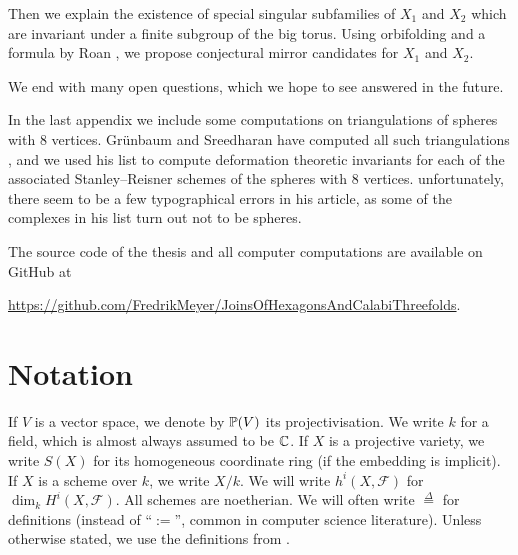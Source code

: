 \begin{itemize}
Then we explain the existence of special singular subfamilies of $X_1$ and $X_2$ which are invariant under a finite subgroup of the big torus. Using {orbifolding} and a formula by Roan \cite{roan_euler}, we propose conjectural mirror candidates for $X_1$ and $X_2$.

We end with many open questions, which we hope to see answered in the future.
\end{itemize}

In the last appendix we include some computations on triangulations of spheres with $8$ vertices. Grünbaum and Sreedharan have computed all such triangulations \cite{grunbaum_enumeration}, and we used his list to compute deformation theoretic invariants for each of the associated Stanley--Reisner schemes of the spheres with $8$ vertices. unfortunately, there seem to be a few typographical errors in his article, as some of the complexes in his list turn out not to be spheres.

The source code of the thesis and all computer computations are available on GitHub at
\begin{center}
\small{\url{https://github.com/FredrikMeyer/JoinsOfHexagonsAndCalabiThreefolds}}.
\end{center}

\section{Notation}

If $V$ is a vector space, we denote by $\P(V)$ its projectivisation. We write $k$ for a field, which is almost always assumed to be $\C$. If $X$ is a projective variety, we write $S(X)$ for its homogeneous coordinate ring (if the embedding is implicit). If $X$ is a scheme over $k$, we write $X/k$. We will write $h^i(X,\mathscr F)$ for $\dim_k H^i(X,\mathscr F)$. All schemes are noetherian. We will often write $\stackrel \Delta = $ for definitions (instead of  ``$:=$'', common in computer science literature). Unless otherwise stated, we use the definitions from \cite{hartshorne}.